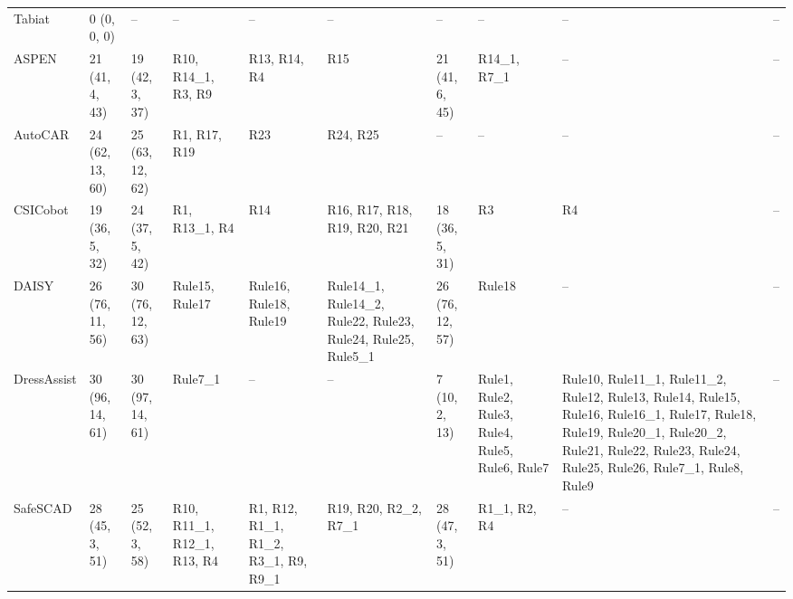 \begin{table}[t]
{\begin{tabular}{llllllllll}
Tabiat & 0 (0, 0, 0) & -- & -- & -- & -- & -- & -- & -- & -- \\
ASPEN & 21 (41, 4, 43) & 19 (42, 3, 37) & R10, R14\_1, R3, R9 & R13, R14, R4 & R15 & 21 (41, 6, 45) & R14\_1, R7\_1 & -- & -- \\
AutoCAR & 24 (62, 13, 60) & 25 (63, 12, 62) & R1, R17, R19 & R23 & R24, R25 & -- & -- & -- & -- \\
CSICobot & 19 (36, 5, 32) & 24 (37, 5, 42) & R1, R13\_1, R4 & R14 & R16, R17, R18, R19, R20, R21 & 18 (36, 5, 31) & R3 & R4 & -- \\
DAISY & 26 (76, 11, 56) & 30 (76, 12, 63) & Rule15, Rule17 & Rule16, Rule18, Rule19 & Rule14\_1, Rule14\_2, Rule22, Rule23, Rule24, Rule25, Rule5\_1 & 26 (76, 12, 57) & Rule18 & -- & -- \\
DressAssist & 30 (96, 14, 61) & 30 (97, 14, 61) & Rule7\_1 & -- & -- & 7 (10, 2, 13) & Rule1, Rule2, Rule3, Rule4, Rule5, Rule6, Rule7 & Rule10, Rule11\_1, Rule11\_2, Rule12, Rule13, Rule14, Rule15, Rule16, Rule16\_1, Rule17, Rule18, Rule19, Rule20\_1, Rule20\_2, Rule21, Rule22, Rule23, Rule24, Rule25, Rule26, Rule7\_1, Rule8, Rule9 & -- \\
SafeSCAD & 28 (45, 3, 51) & 25 (52, 3, 58) & R10, R11\_1, R12\_1, R13, R4 & R1, R12, R1\_1, R1\_2, R3\_1, R9, R9\_1 & R19, R20, R2\_2, R7\_1 & 28 (47, 3, 51) & R1\_1, R2, R4 & -- & -- \\
\bottomrule
\end{tabular}%
}
\end{table}
